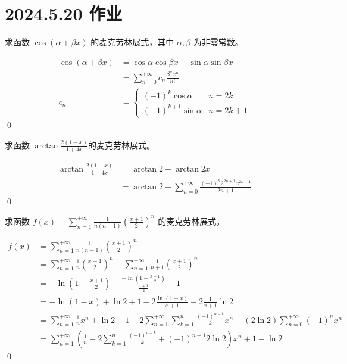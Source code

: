 \ifx\allfiles\undefined

\date{}
\author{尹锦润}

\maketitle
\fi

\section{2024.5.20 作业}
\begin{ques}
	求函数 $\displaystyle \cos( \alpha +\beta x)$ 的麦克劳林展式，其中 $\displaystyle \alpha ,\beta $ 为非零常数。
\end{ques}
\begin{align*}
	\cos( \alpha +\beta x) & =\cos \alpha \cos \beta x-\sin \alpha \sin \beta x\\
	& =\sum _{n=0}^{+\infty } c_{n}\frac{\beta ^{n} x^{n}}{n!}\\
	c_{n} & =\begin{cases}
		( -1)^{k}\cos \alpha  & n=2k\\
		( -1)^{k+1}\sin \alpha  & n=2k+1
	\end{cases}
\end{align*}
\qed 





\begin{ques}
	求函数 $\displaystyle \arctan\frac{2( 1-x)}{1+4x}$的麦克劳林展式。
\end{ques}
\begin{align*}
	\arctan\frac{2( 1-x)}{1+4x} & =\arctan 2-\arctan 2x\\
	& =\arctan 2-\sum _{n=0}^{+\infty }\frac{( -1)^{n} 2^{2n+1} x^{2n+1}}{2n+1}
\end{align*}\qed 



\begin{ques}
	求函数 $\displaystyle f( x) =\sum _{n=1}^{+\infty }\frac{1}{n( n+1)}\left(\frac{x+1}{2}\right)^{n}$ 的麦克劳林展式。
\end{ques}
\begin{align*}
	f( x) & =\sum _{n=1}^{+\infty }\frac{1}{n( n+1)}\left(\frac{x+1}{2}\right)^{n}\\
	& =\sum _{n=1}^{+\infty }\frac{1}{n}\left(\frac{x+1}{2}\right)^{n} -\sum _{n=1}^{+\infty }\frac{1}{n+1}\left(\frac{x+1}{2}\right)^{n}\\
	& =-\ln\left( 1-\frac{x+1}{2}\right) -\frac{-\ln\left( 1-\frac{x+1}{2}\right)}{\frac{x+1}{2}} +1\\
	& =-\ln( 1-x) +\ln 2+1-2\frac{\ln( 1-x)}{x+1} -2\frac{1}{x+1}\ln 2\\
	& =\sum _{n=1}^{+\infty }\frac{1}{n} x^{n} +\ln 2+1-2\sum _{n=1}^{+\infty }\sum _{k=1}^{n}\frac{( -1)^{n-k}}{k} x^{n} -( 2\ln 2)\sum _{n=0}^{+\infty }( -1)^{n} x^{n}\\
	& =\sum _{n=1}^{+\infty }\left(\frac{1}{n} -2\sum _{k=1}^{n}\frac{( -1)^{n-k}}{k} +( -1)^{n+1} 2\ln 2\right) x^{n} +1-\ln 2
\end{align*}
\qed



